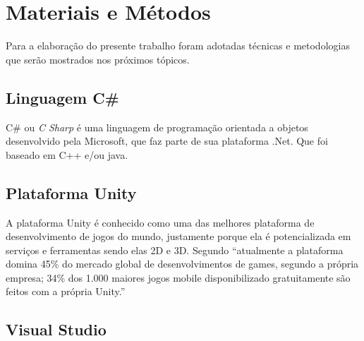 
\chapter{Materiais e Métodos}

Para a elaboração do presente trabalho foram adotadas técnicas e metodologias que serão mostrados nos próximos tópicos.

\section{Linguagem C\#}

C\# ou \textit{C Sharp} é uma linguagem de programação orientada a objetos desenvolvido pela Microsoft, que faz parte de sua plataforma .Net. Que foi baseado em C++ e/ou java.

\section{Plataforma Unity}

A plataforma Unity é conhecido como uma das melhores plataforma de desenvolvimento de jogos do mundo, justamente porque ela é potencializada em serviços e ferramentas sendo elas 2D e 3D.
Segundo  \enquote{atualmente a plataforma domina 45\% do mercado global de desenvolvimentos de games, segundo a própria empresa; 34\% dos 1.000 maiores jogos mobile disponibilizado gratuitamente são feitos com a própria Unity.}

\section{Visual Studio}

